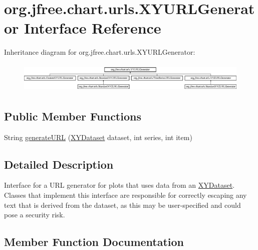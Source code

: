 \hypertarget{interfaceorg_1_1jfree_1_1chart_1_1urls_1_1_x_y_u_r_l_generator}{}\section{org.\+jfree.\+chart.\+urls.\+X\+Y\+U\+R\+L\+Generator Interface Reference}
\label{interfaceorg_1_1jfree_1_1chart_1_1urls_1_1_x_y_u_r_l_generator}
Inheritance diagram for org.\+jfree.\+chart.\+urls.\+X\+Y\+U\+R\+L\+Generator\+:\begin{figure}[H]
\begin{center}
\leavevmode
\includegraphics[height=1.453287cm]{interfaceorg_1_1jfree_1_1chart_1_1urls_1_1_x_y_u_r_l_generator}
\end{center}
\end{figure}
\subsection*{Public Member Functions}
\begin{DoxyCompactItemize}
\item 
String \mbox{\hyperlink{interfaceorg_1_1jfree_1_1chart_1_1urls_1_1_x_y_u_r_l_generator_a2d0a4d93213e76edab36cfc00f5c99cd}{generate\+U\+RL}} (\mbox{\hyperlink{interfaceorg_1_1jfree_1_1data_1_1xy_1_1_x_y_dataset}{X\+Y\+Dataset}} dataset, int series, int item)
\end{DoxyCompactItemize}


\subsection{Detailed Description}
Interface for a U\+RL generator for plots that uses data from an \mbox{\hyperlink{}{X\+Y\+Dataset}}. Classes that implement this interface are responsible for correctly escaping any text that is derived from the dataset, as this may be user-\/specified and could pose a security risk. 

\subsection{Member Function Documentation}
\mbox{\label{interfaceorg_1_1jfree_1_1chart_1_1urls_1_1_x_y_u_r_l_generator_a2d0a4d93213e76edab36cfc00f5c99cd}} 
